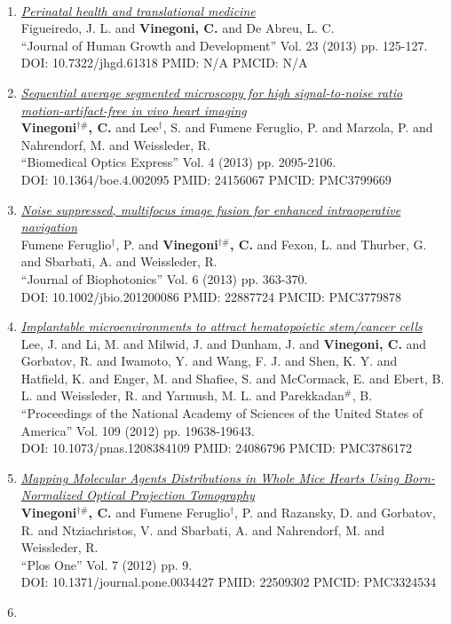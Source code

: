 \documentclass{resume}
\begin{document}
\begin{category}{~~}
\begin{enumerate}
(2014) pp. 9. \\ DOI: 10.1109/jstqe.2013.2279314 PMID: 24273405 PMCID: PMC3832946\item \href{https://cvinegoni.github.io/assets/pdf/papers/2013-JHGD.pdf}{\it  Perinatal health and translational medicine} \\ Figueiredo, J. L. and {\bf Vinegoni, C.} and De Abreu, L. C. \\ ``Journal of Human Growth and Development'' Vol. 23 (2013) pp. 125-127. \\ DOI: 10.7322/jhgd.61318 PMID: N/A PMCID: N/A\item \href{https://cvinegoni.github.io/assets/pdf/papers/2013-BOE.pdf}{\it  Sequential average segmented microscopy for high signal-to-noise ratio motion-artifact-free in vivo heart imaging} \\ {\bf Vinegoni$^{\dag \#}$, C.} and Lee$^\dag$, S. and Fumene Feruglio, P. and Marzola, P. and Nahrendorf, M. and Weissleder, R. \\ ``Biomedical Optics Express'' Vol. 4 (2013) pp. 2095-2106. \\ DOI: 10.1364/boe.4.002095 PMID: 24156067 PMCID: PMC3799669\item \href{https://cvinegoni.github.io/assets/pdf/papers/2013-BIOPHTNCS.pdf}{\it  Noise suppressed, multifocus image fusion for enhanced intraoperative navigation} \\ Fumene Feruglio$^\dag$, P. and {\bf Vinegoni$^{\dag \#}$, C.} and Fexon, L. and Thurber, G. and Sbarbati, A. and Weissleder, R. \\ ``Journal of Biophotonics'' Vol. 6 (2013) pp. 363-370. \\ DOI: 10.1002/jbio.201200086 PMID: 22887724 PMCID: PMC3779878\item \href{https://cvinegoni.github.io/assets/pdf/papers/2012-PNAS.pdf}{\it  Implantable microenvironments to attract hematopoietic stem/cancer cells} \\ Lee, J. and Li, M. and Milwid, J. and Dunham, J. and {\bf Vinegoni, C.} and Gorbatov, R. and Iwamoto, Y. and Wang, F. J. and Shen, K. Y. and Hatfield, K. and Enger, M. and Shafiee, S. and McCormack, E. and Ebert, B. L. and Weissleder, R. and Yarmush, M. L. and Parekkadan$^\#$, B. \\ ``Proceedings of the National Academy of Sciences of the United States of America'' Vol. 109 (2012) pp. 19638-19643. \\ DOI: 10.1073/pnas.1208384109 PMID: 24086796 PMCID: PMC3786172\item \href{https://cvinegoni.github.io/assets/pdf/papers/2012-PLOSONE.pdf}{\it  Mapping Molecular Agents Distributions in Whole Mice Hearts Using Born-Normalized Optical Projection Tomography} \\ {\bf Vinegoni$^{\dag \#}$, C.} and Fumene Feruglio$^\dag$, P. and Razansky, D. and Gorbatov, R. and Ntziachristos, V. and Sbarbati, A. and Nahrendorf, M. and Weissleder, R. \\ ``Plos One'' Vol. 7 (2012) pp. 9. \\ DOI: 10.1371/journal.pone.0034427 PMID: 22509302 PMCID: PMC3324534\item 
\end{enumerate}
\end{category}
\end{document}

